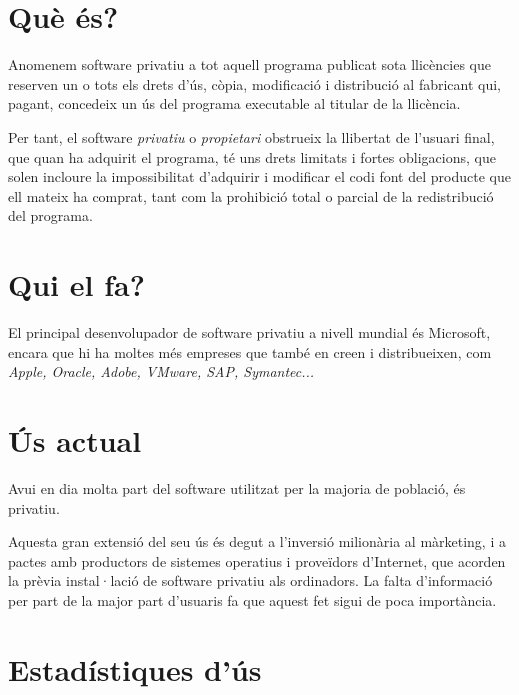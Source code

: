 \section{Què és?}

Anomenem software privatiu a tot aquell programa publicat sota llicències
que reserven un o tots els drets d'ús, còpia, modificació i distribució
al fabricant qui, pagant, concedeix un ús del programa executable al titular
de la llicència.

Per tant, el software \emph{privatiu} o \emph{propietari} obstrueix la llibertat
de l'usuari final, que quan ha adquirit el programa, té uns drets limitats i fortes
obligacions, que solen incloure la impossibilitat d'adquirir i modificar el codi font del producte
que ell mateix ha comprat, tant com la prohibició total o parcial de la redistribució del programa.
\cite{gnucategories}

\section{Qui el fa?}

El principal desenvolupador de software privatiu a nivell mundial és Microsoft, encara que hi
ha moltes més empreses que també en creen i distribueixen, com \emph{Apple, Oracle, Adobe, VMware,
SAP, Symantec...}\cite{privatiuempreses}

\section{Ús actual}

Avui en dia molta part del software utilitzat per la majoria de població, és privatiu.

Aquesta gran extensió del seu ús és degut a l'inversió milionària al màrketing, i a
pactes amb productors de sistemes operatius i proveïdors d'Internet, que acorden la
prèvia instal·lació de software privatiu als ordinadors. La falta d'informació per
part de la major part d'usuaris fa que aquest fet sigui de poca importància.

\section{Estadístiques d'ús}

